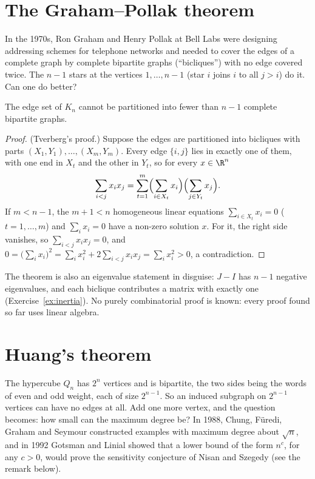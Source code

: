 \section{The Graham--Pollak theorem}

In the 1970s, Ron Graham and Henry Pollak at Bell Labs were designing addressing schemes for telephone networks and needed to
cover the edges of a complete graph by complete bipartite graphs (``bicliques'') with no edge covered twice. The $n-1$ stars at
the vertices $1,\dots,n-1$ (star $i$ joins $i$ to all $j>i$) do it. Can one do better?

\begin{theorem}\label{thm:grahampollak}
The edge set of $K_n$ cannot be partitioned into fewer than $n-1$ complete bipartite graphs.
\end{theorem}
\begin{proof}
(Tverberg's proof.) Suppose the edges are partitioned into bicliques with parts $(X_1,Y_1),\dots,(X_m,Y_m)$. Every edge $\{i,j\}$
lies in exactly one of them, with one end in $X_t$ and the other in $Y_t$, so for every $x\in\R^n$
\[
\sum_{i<j}x_ix_j=\sum_{t=1}^m\Bigl(\sum_{i\in X_t}x_i\Bigr)\Bigl(\sum_{j\in Y_t}x_j\Bigr).
\]
If $m<n-1$, the $m+1<n$ homogeneous linear equations $\sum_{i\in X_t}x_i=0$ ($t=1,\dots,m$) and $\sum_ix_i=0$ have a non-zero solution
$x$. For it, the right side vanishes, so $\sum_{i<j}x_ix_j=0$, and $0=\bigl(\sum_ix_i\bigr)^2=\sum_ix_i^2+2\sum_{i<j}x_ix_j=\sum_i
x_i^2>0$, a contradiction.
\end{proof}

The theorem is also an eigenvalue statement in disguise: $J-I$ has $n-1$ negative eigenvalues, and each biclique contributes a
matrix with exactly one (Exercise~\ref{ex:inertia}). No purely combinatorial proof is known: every proof found so far uses linear
algebra.

\section{Huang's theorem}

The hypercube $Q_n$ has $2^n$ vertices and is bipartite, the two sides being the words of even and odd weight, each of size
$2^{n-1}$. So an induced subgraph on $2^{n-1}$ vertices can have no edges at all. Add one more vertex, and the question becomes:
how small can the maximum degree be? In 1988, Chung, F\"uredi, Graham and Seymour constructed examples with maximum degree about
$\sqrt n$, and in 1992 Gotsman and Linial showed that a lower bound of the form $n^c$, for any $c>0$, would prove the sensitivity
conjecture of Nisan and Szegedy (see the remark below).


